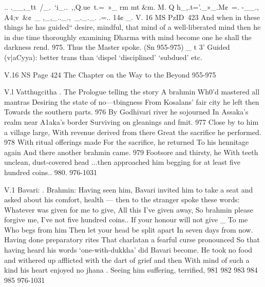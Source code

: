    
   
   .. .__,_\.tt~/_.~`i_..~,,Q.ue~t.=~»_ rm mt &m.   M. Q   h_,.t='._»_.M¢~=.  -_\M_., A4;v~&¢~_ ,_,_.._.,~_._._. .=.. 14¢ _.
   V. 16
   MS PzID~423
   And when in these things he has guided“ desire,
   mindful, that mind of a well-liberated mind
   then he in due time thoroughly examining Dharma
   with mind become one he shall the darkness rend.
   975.
   Thus the Master spoke.
   (Sn 955-975)
   _  t
   3' Guided (v|aCyya): better trans than `dispel `disciplined' `subdued' etc.
   
   
   
   V.16
   NS Page 424
   The Chapter
   on the Way to the Beyond
   955-975
   
   
   
   V.l
   Vatthugcitha
   . The Prologue telling the story
   A brahmin Wh0'd mastered all mantras
   Desiring the state of no—tbingness
   From Kosalans' fair city he left then
   Towards the southern parts. 976
   By Godhivari river he sojourned
   In Assaka's realm near A1aka's border
   Surviving on gleanings and fmit. 977
   Close by to him a village large,
   With revenue derived from there
   Great the sacriﬁce he performed. 978
   With ritual offerings made
   For the sacriﬁce, he returned
   To his hennitage again
   And there another brahmin came. 979
   Footsore and thirsty, he
   With teeth unclean, dust-covered head
   ...then approached him begging for
   at least five hundred coins.. 980.
   976-1031 \/
   
   
   
   
   
   
   V.1
   Bavari:
   . Brahmin:
   Having seen him, Bavari
   invited him to take a seat
   and asked about his comfort, health —
   then to the stranger spoke these words:
   Whatever was given for me to give,
   All this I've given away,
   So brahmin please forgive me,
   I've not five hundred coins..
   If your honour will not give _
   To me Who begs from him
   Then let your head be split apart
   In seven days from now.
   Having done preparatory rites
   That charlatan a fearful curse pronounced
   So that having heard his words
   `one-with-dukkha' did Bavari become.
   He took no food and withered up
   afflicted with the dart of grief
   and then With mind of such a kind
   his heart enjoyed no jhana .
   Seeing him suffering, terriﬁed,
   981
   982
   983
   984
   985
   976-1031
   
   
   
   
   
